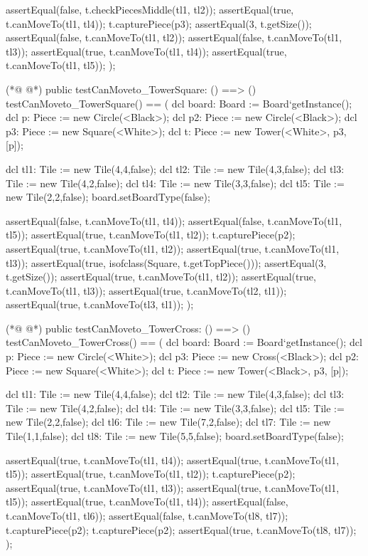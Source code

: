 \begin{vdmpp}[breaklines=true]
  assertEqual(false, t.checkPiecesMiddle(tl1, tl2));
  assertEqual(true, t.canMoveTo(tl1, tl4));
   t.capturePiece(p3);
   assertEqual(3, t.getSize());
   assertEqual(false, t.canMoveTo(tl1, tl2));
  assertEqual(false, t.canMoveTo(tl1, tl3));
   assertEqual(true, t.canMoveTo(tl1, tl4));
   assertEqual(true, t.canMoveTo(tl1, tl5));
  );
  
(*@
\label{testCanMoveto:TowerSquare:74}
@*)
  public testCanMoveto_TowerSquare: () ==> ()
  testCanMoveto_TowerSquare() == (
   dcl board: Board := Board`getInstance();
   dcl p: Piece := new Circle(<Black>);
   dcl p2: Piece := new Circle(<Black>);
   dcl p3: Piece := new Square(<White>);
   dcl t: Piece := new Tower(<White>, p3, [p]);
   
   dcl tl1: Tile := new Tile(4,4,false);
   dcl tl2: Tile := new Tile(4,3,false);
   dcl tl3: Tile := new Tile(4,2,false);
   dcl tl4: Tile := new Tile(3,3,false);
   dcl tl5: Tile := new Tile(2,2,false);
   board.setBoardType(false);
   
   assertEqual(false, t.canMoveTo(tl1, tl4));
  assertEqual(false, t.canMoveTo(tl1, tl5));
   assertEqual(true, t.canMoveTo(tl1, tl2));
   t.capturePiece(p2);
   assertEqual(true, t.canMoveTo(tl1, tl2));
   assertEqual(true, t.canMoveTo(tl1, tl3));
   assertEqual(true, isofclass(Square, t.getTopPiece()));
   assertEqual(3, t.getSize());
   assertEqual(true, t.canMoveTo(tl1, tl2));
   assertEqual(true, t.canMoveTo(tl1, tl3));
   assertEqual(true, t.canMoveTo(tl2, tl1));
   assertEqual(true, t.canMoveTo(tl3, tl1));
  );
  
(*@
\label{testCanMoveto:TowerCross:103}
@*)
  public testCanMoveto_TowerCross: () ==> ()
  testCanMoveto_TowerCross() == (
   dcl board: Board := Board`getInstance();
   dcl p: Piece := new Circle(<White>);
   dcl p3: Piece := new Cross(<Black>);
   dcl p2: Piece := new Square(<White>);
   dcl t: Piece := new Tower(<Black>, p3, [p]);
   
   dcl tl1: Tile := new Tile(4,4,false);
   dcl tl2: Tile := new Tile(4,3,false);
   dcl tl3: Tile := new Tile(4,2,false);
   dcl tl4: Tile := new Tile(3,3,false);
   dcl tl5: Tile := new Tile(2,2,false);
   dcl tl6: Tile := new Tile(7,2,false);
   dcl tl7: Tile := new Tile(1,1,false);
   dcl tl8: Tile := new Tile(5,5,false);
   board.setBoardType(false);

   assertEqual(true, t.canMoveTo(tl1, tl4));
  assertEqual(true, t.canMoveTo(tl1, tl5));
   assertEqual(true, t.canMoveTo(tl1, tl2));
   t.capturePiece(p2);
   assertEqual(true, t.canMoveTo(tl1, tl3));
   assertEqual(true, t.canMoveTo(tl1, tl5));
   assertEqual(true, t.canMoveTo(tl1, tl4));
   assertEqual(false, t.canMoveTo(tl1, tl6));
   assertEqual(false, t.canMoveTo(tl8, tl7));
   t.capturePiece(p2);
   t.capturePiece(p2);
   assertEqual(true, t.canMoveTo(tl8, tl7));
  );
  

\end{vdmpp}
